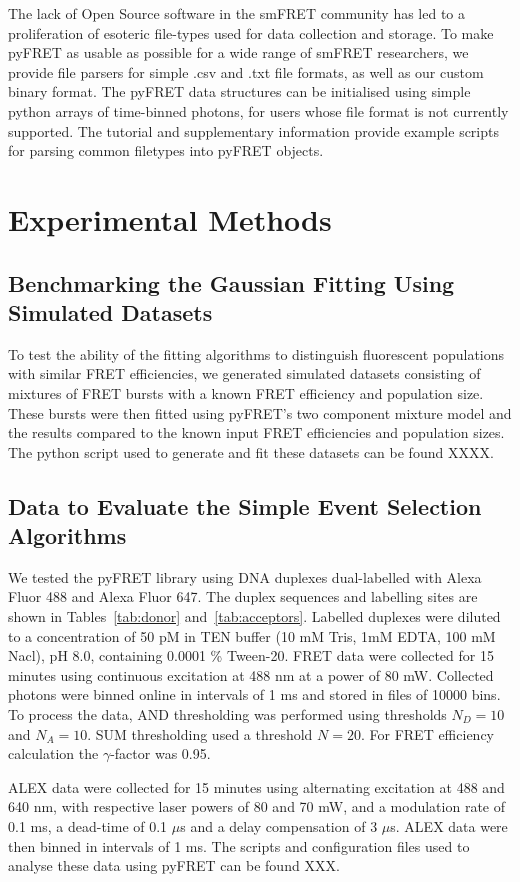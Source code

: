 The lack of Open Source software in the smFRET community has led to a proliferation of esoteric file-types used for data collection and storage. To make pyFRET as usable as possible for a wide range of smFRET researchers, we provide file parsers for simple .csv and .txt file formats, as well as our custom binary format. The pyFRET data structures can be initialised using simple python arrays of time-binned photons, for users whose file format is not currently supported. The tutorial and supplementary information provide example scripts for parsing common filetypes into pyFRET objects.

\section{Experimental Methods}
\subsection{Benchmarking the Gaussian Fitting Using Simulated Datasets}
To test the ability of the fitting algorithms to distinguish fluorescent populations with similar FRET efficiencies, we generated simulated datasets consisting of mixtures of FRET bursts with a known FRET efficiency and population size. These bursts were then fitted using pyFRET's two component mixture model and the results compared to the known input FRET efficiencies and population sizes. The python script used to generate and fit these datasets can be found XXXX. 

\subsection{Data to Evaluate the Simple Event Selection Algorithms}
We tested the pyFRET library using DNA duplexes dual-labelled with Alexa Fluor 488 and Alexa Fluor 647. The duplex sequences and labelling sites are shown in Tables~\ref{tab:donor} and~\ref{tab:acceptors}. Labelled duplexes were diluted to a concentration of 50 pM in TEN buffer (10 mM Tris, 1mM EDTA, 100 mM Nacl), pH 8.0, containing 0.0001 \% Tween-20. FRET data were collected for 15 minutes using continuous excitation at 488 nm at a power of 80 mW. Collected photons were binned online in intervals of 1 ms and stored in files of 10000 bins. To process the data, AND thresholding was performed using thresholds $N_D = 10$ and $N_A = 10$. SUM thresholding used a threshold $N = 20$. For FRET efficiency calculation the $\gamma$-factor was 0.95.

ALEX data were collected for 15 minutes using alternating excitation at 488 and 640 nm, with respective laser powers of 80 and 70 mW, and a modulation rate of 0.1 ms, a dead-time of 0.1 $\mu$s and a delay compensation of 3 $\mu$s. ALEX data were then binned in intervals of 1 ms. The scripts and configuration files used to analyse these data using pyFRET can be found XXX.

